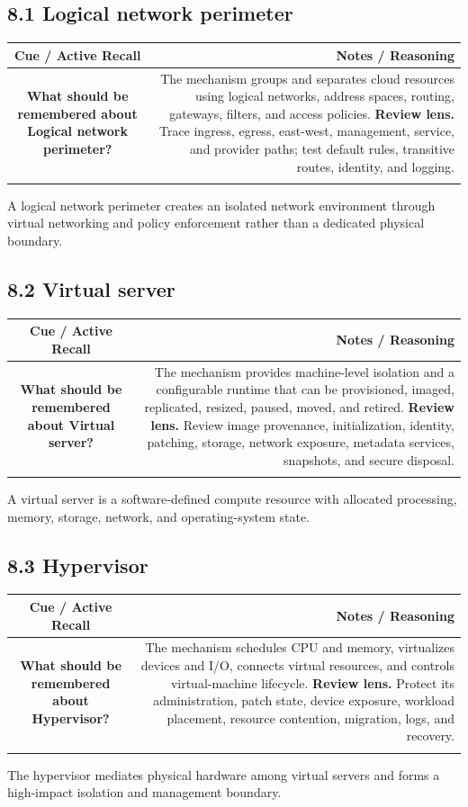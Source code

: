 \documentclass[11pt]{article}
\newcommand{\CornellHeader}{\rowcolor{Navy}\color{white}\bfseries Cue / Active Recall & \color{white}\bfseries Notes / Reasoning \\\endhead}
\newcommand{\CornellRow}[2]{\cellcolor{CueGray}\textbf{#1} & #2 \\\addlinespace[3pt]}
\begin{document}
\subsection{8.1 Logical network perimeter}
\begin{longtable}{@{}C N@{}}
\CornellHeader
\CornellRow{What should be remembered about Logical network perimeter?}{The mechanism groups and separates cloud resources using logical networks, address spaces, routing, gateways, filters, and access policies. \textbf{Review lens.} Trace ingress, egress, east-west, management, service, and provider paths; test default rules, transitive routes, identity, and logging.}
\end{longtable}
\begin{sectionsummarybox}
A logical network perimeter creates an isolated network environment through virtual networking and policy enforcement rather than a dedicated physical boundary.
\end{sectionsummarybox}
\subsection{8.2 Virtual server}
\begin{longtable}{@{}C N@{}}
\CornellHeader
\CornellRow{What should be remembered about Virtual server?}{The mechanism provides machine-level isolation and a configurable runtime that can be provisioned, imaged, replicated, resized, paused, moved, and retired. \textbf{Review lens.} Review image provenance, initialization, identity, patching, storage, network exposure, metadata services, snapshots, and secure disposal.}
\end{longtable}
\begin{sectionsummarybox}
A virtual server is a software-defined compute resource with allocated processing, memory, storage, network, and operating-system state.
\end{sectionsummarybox}
\subsection{8.3 Hypervisor}
\begin{longtable}{@{}C N@{}}
\CornellHeader
\CornellRow{What should be remembered about Hypervisor?}{The mechanism schedules CPU and memory, virtualizes devices and I/O, connects virtual resources, and controls virtual-machine lifecycle. \textbf{Review lens.} Protect its administration, patch state, device exposure, workload placement, resource contention, migration, logs, and recovery.}
\end{longtable}
\begin{sectionsummarybox}
The hypervisor mediates physical hardware among virtual servers and forms a high-impact isolation and management boundary.
\end{sectionsummarybox}
\end{document}
